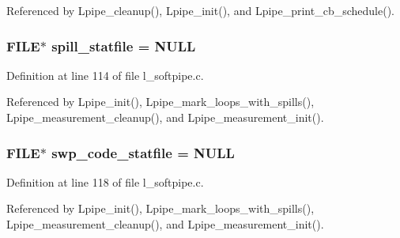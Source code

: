 Referenced by Lpipe\_\-cleanup(), Lpipe\_\-init(), and Lpipe\_\-print\_\-cb\_\-schedule().
\subsubsection{\setlength{\rightskip}{0pt plus 5cm}FILE$\ast$ \bf{spill\_\-statfile} = NULL}\label{l__softpipe_8c_b31a94b2b54c2bff51947401462afb8a}




Definition at line 114 of file l\_\-softpipe.c.

Referenced by Lpipe\_\-init(), Lpipe\_\-mark\_\-loops\_\-with\_\-spills(), Lpipe\_\-measurement\_\-cleanup(), and Lpipe\_\-measurement\_\-init().
\subsubsection{\setlength{\rightskip}{0pt plus 5cm}FILE$\ast$ \bf{swp\_\-code\_\-statfile} = NULL}\label{l__softpipe_8c_6124881d1ab46cfbcebdfa6852499434}




Definition at line 118 of file l\_\-softpipe.c.

Referenced by Lpipe\_\-init(), Lpipe\_\-mark\_\-loops\_\-with\_\-spills(), Lpipe\_\-measurement\_\-cleanup(), and Lpipe\_\-measurement\_\-init().